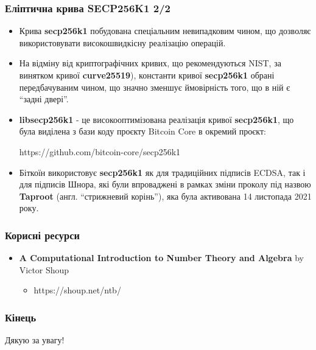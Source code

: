 \documentclass{beamer}
\begin{document}
\begin{frame}
  \frametitle{Еліптична крива SECP256K1 2/2}
  \begin{itemize}
  \item Крива \textbf{secp256k1} побудована спеціальним невипадковим чином, що
    дозволяє використовувати високошвидкісну реалізацію операцій.
  \item На відміну від криптографічних кривих, що рекомендуються NIST, за
    винятком кривої \textbf{curve25519}), константи кривої \textbf{secp256k1}
    обрані передбачуваним чином, що значно зменшує ймовірність того, що в ній є
    ``задні двері''.
  \item \textbf{libsecp256k1} - це високооптимізована реалізація кривої
    \textbf{secp256k1}, що була виділена з бази коду проєкту Bitcoin Core в
    окремий проєкт:
    \begin{center}
      https://github.com/bitcoin-core/secp256k1
    \end{center}
  \item Біткоїн використовує \textbf{secp256k1} як для традиційних підписів
    ECDSA, так і для підписів Шнора, які були впроваджені в рамках зміни проколу
    під назвою \textbf{Taproot} (англ. ``стрижневий корінь''), яка була
    активована 14 листопада 2021 року.
  \end{itemize}    
\end{frame}

\begin{frame}
  \frametitle{Корисні ресурси}
  \begin{itemize}
  \item \textbf{A Computational Introduction to Number Theory and Algebra} by
    Victor Shoup
    \begin{itemize}
    \item https://shoup.net/ntb/
    \end{itemize}
  \end{itemize}
\end{frame}

\begin{frame}
  \frametitle{Кінець}
  \begin{center}
    Дякую за увагу!
  \end{center}
\end{frame}
\end{document}
